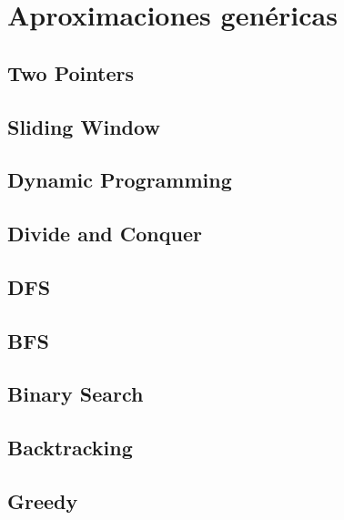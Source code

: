 \section{Aproximaciones genéricas}

\subsection{Two Pointers}

\subsection{Sliding Window}

\subsection{Dynamic Programming}

\subsection{Divide and Conquer}

\subsection{DFS}

\subsection{BFS}

\subsection{Binary Search}

\subsection{Backtracking}

\subsection{Greedy}

